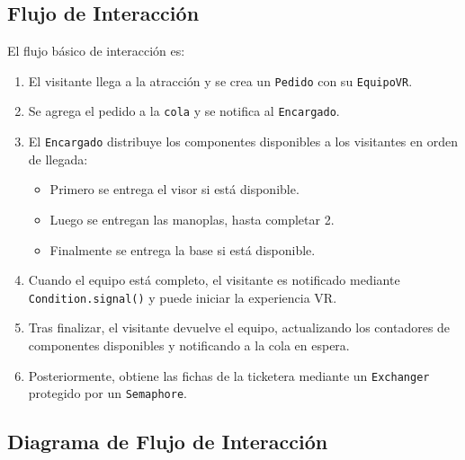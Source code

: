 \documentclass[12pt,a4paper]{article}
\begin{document}
\subsection{Flujo de Interacción}

El flujo básico de interacción es:

\begin{enumerate}
    \item El visitante llega a la atracción y se crea un \texttt{Pedido} con su \texttt{EquipoVR}.
    \item Se agrega el pedido a la \texttt{cola} y se notifica al \texttt{Encargado}.
    \item El \texttt{Encargado} distribuye los componentes disponibles a los visitantes en orden de llegada:
    \begin{itemize}
        \item Primero se entrega el visor si está disponible.
        \item Luego se entregan las manoplas, hasta completar 2.
        \item Finalmente se entrega la base si está disponible.
    \end{itemize}
    \item Cuando el equipo está completo, el visitante es notificado mediante \texttt{Condition.signal()} y puede iniciar la experiencia VR.
    \item Tras finalizar, el visitante devuelve el equipo, actualizando los contadores de componentes disponibles y notificando a la cola en espera.
    \item Posteriormente, obtiene las fichas de la ticketera mediante un \texttt{Exchanger} protegido por un \texttt{Semaphore}.
\end{enumerate}

\subsection{Diagrama de Flujo de Interacción}
\end{document}
